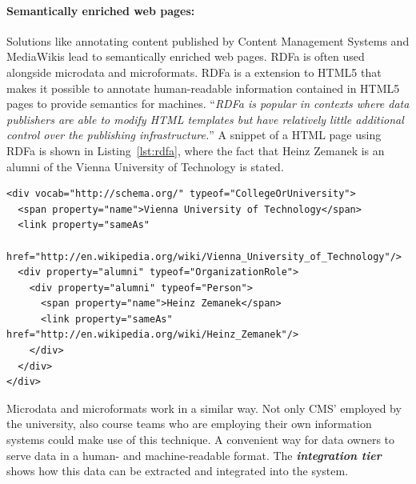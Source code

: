 \documentclass{article}
\begin{document}
\paragraph{Semantically enriched web pages:} Solutions like annotating content published by Content Management Systems and MediaWikis lead to semantically enriched web pages. RDFa is often used alongside microdata and microformats. RDFa is a extension to HTML5 that makes it possible to annotate human-readable information contained in HTML5 pages to provide semantics for machines. ``\textit{RDFa is popular in contexts where data publishers are able to modify HTML templates but have relatively little additional control over the publishing infrastructure.}'' \cite{heath_linked_2011} A snippet of a HTML page using RDFa is shown in Listing~\ref{lst:rdfa}, where the fact that Heinz Zemanek is an alumni of the Vienna University of Technology is stated.

\begin{lstlisting}[caption={A snippet of a HTML page using RDFa},label={lst:rdfa}]
<div vocab="http://schema.org/" typeof="CollegeOrUniversity">
  <span property="name">Vienna University of Technology</span>
  <link property="sameAs"
        href="http://en.wikipedia.org/wiki/Vienna_University_of_Technology"/>
  <div property="alumni" typeof="OrganizationRole">
    <div property="alumni" typeof="Person">
      <span property="name">Heinz Zemanek</span>
      <link property="sameAs" href="http://en.wikipedia.org/wiki/Heinz_Zemanek"/>
    </div>
  </div>
</div>
\end{lstlisting}
Microdata and microformats work in a similar way. Not only CMS' employed by the university, also course teams who are employing their own information systems could make use of this technique. A convenient way for data owners to serve data in a human- and machine-readable format. The \textbf{\textit{integration tier}} shows how this data can be extracted and integrated into the system.
\end{document}
